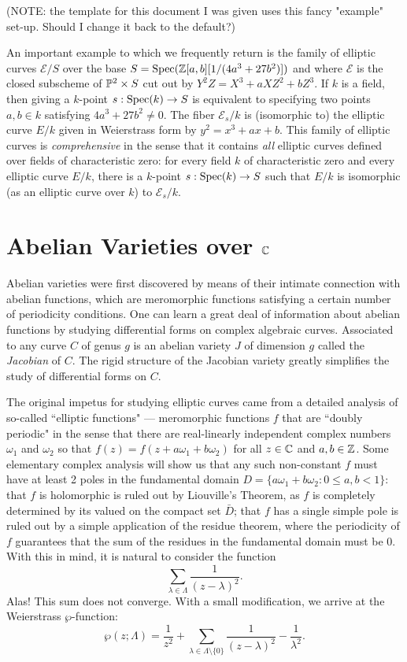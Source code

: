 (NOTE: the template for this document I was given uses this fancy "example" set-up. Should I change it back to the default?)
\begin{example}
An important example to which we frequently return is the family of elliptic curves $\mathcal{E}/S$ over the base $S=\operatorname{Spec}(\mathbb{Z}[a,b][1/(4a^3+27b^2)])$ and where $\mathcal{E}$ is the closed subscheme of $\mathbb{P}^2\times S$ cut out by $Y^2Z=X^3+aXZ^2+bZ^3$. If $k$ is a field, then  giving a $k$-point $s:\operatorname{Spec}(k)\rightarrow S$ is equivalent to specifying two points $a,b\in k$ satisfying $4a^3+27b^2\neq 0$. The fiber $\mathcal{E}_s/k$ is (isomorphic to) the elliptic curve $E/k$ given in Weierstrass form by $y^2=x^3+ax+b$. This family of elliptic curves is \emph{comprehensive} in the sense that it contains \emph{all} elliptic curves defined over fields of characteristic zero: for every field $k$ of characteristic zero and every elliptic curve $E/k$, there is a $k$-point $s:\operatorname{Spec}(k)\rightarrow S$ such that $E/k$ is isomorphic (as an elliptic curve over $k$) to $\mathcal{E}_s/k$.
\end{example}

\section{Abelian Varieties over $\mathbb{C}$}

Abelian varieties were first discovered by means of their intimate connection with abelian functions, which are meromorphic functions satisfying a certain number of periodicity conditions. One can learn a great deal of information about abelian functions by studying differential forms on complex algebraic curves. Associated to any curve $C$ of genus $g$ is an abelian variety $J$ of dimension $g$ called the \emph{Jacobian} of $C$. The rigid structure of the Jacobian variety greatly simplifies the study of differential forms on $C$.

The original impetus for studying elliptic curves came from a detailed analysis of so-called ``elliptic functions" --- meromorphic functions $f$ that are ``doubly periodic" in the sense that there are real-linearly independent complex numbers $\omega_1$ and $\omega_2$ so that $f(z)=f(z+a\omega_1+b\omega_2)$ for all $z\in \mathbb{C}$ and $a,b\in\mathbb{Z}$. Some elementary complex analysis will show us that any such non-constant $f$ must have at least 2 poles in the fundamental domain $D=\{a\omega_1+b\omega_2: 0\leq a,b< 1\}$: that $f$ is holomorphic is ruled out by Liouville's Theorem, as $f$ is completely determined by its valued on the compact set $\bar{D}$; that $f$ has a single simple pole is ruled out by a simple application of the residue theorem, where the periodicity of $f$ guarantees that the sum of the residues in the fundamental domain must be 0. With this in mind, it is natural to consider the function $$\sum\limits_{\lambda\in \Lambda} \frac{1}{(z-\lambda)^2}.$$ Alas! This sum does not converge. With a small modification, we arrive at the Weierstrass $\wp$-function: $$\wp(z;\Lambda) = \frac{1}{z^2} + \sum\limits_{\lambda\in\Lambda\setminus\{0\}} \frac{1}{(z-\lambda)^2}-\frac{1}{\lambda^2}.$$ 

